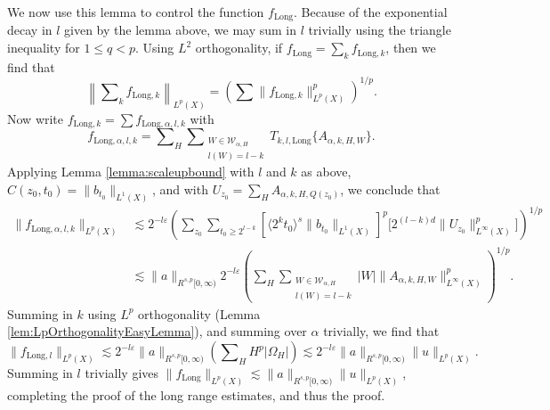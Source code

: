 We now use this lemma to control the function $f_{\text{Long}}$. Because of the exponential decay in $l$ given by the lemma above, we may sum in $l$ trivially using the triangle inequality for $1 \leq q < p$. Using $L^2$ orthogonality, if $f_{\text{Long}} = \sum_k f_{\text{Long},k}$, then we find that
%
\begin{equation}
    \left\| \sum\nolimits_k f_{\text{Long},k} \right\|_{L^p(X)} = \left( \sum \| f_{\text{Long},k} \|_{L^p(X)}^p \right)^{1/p}.
\end{equation}
%
Now write $f_{\text{Long},k} = \sum f_{\text{Long},\alpha,l,k}$ with
%
\begin{equation}
    f_{\text{Long},\alpha,l,k} = \sum\nolimits_H \sum\nolimits_{\substack{W \in \mathcal{W}_{\alpha,H}\\l(W) = l - k}} T_{k,l,\text{Long}} \{ A_{\alpha,k,H,W} \}.
\end{equation}
%
Applying Lemma \ref{lemma:scaleupbound} with $l$ and $k$ as above, $C(z_0,t_0) =  \| b_{t_0} \|_{L^1(X)}$, and with $U_{z_0} = \sum\nolimits_H A_{\alpha,k,H,Q(z_0)}$, we conclude that %
\begin{equation}
\begin{split}
    \| f_{\text{Long},\alpha,l,k} \|_{L^p(X)} &\lesssim 2^{-l \varepsilon} \left( \sum\nolimits_{z_0} \sum\nolimits_{t_0 \geq 2^{l-k}} [ \langle 2^k t_0 \rangle^{s} \| b_{t_0} \|_{L^1(X)} ]^p \big[ 2^{(l-k)d} \| U_{z_0} \|_{L^\infty(X)}^p \big] \right)^{1/p}\\
    &\lesssim \| a \|_{R^{s,p}[0,\infty)} 2^{-l \varepsilon} \left(  \sum\nolimits_H \sum\nolimits_{\substack{W \in \mathcal{W}_{\alpha,H}\\l(W) = l-k}} |W| \| A_{\alpha,k,H,W} \|_{L^\infty(X)}^p \right)^{1/p}.
\end{split}
\end{equation}
Summing in $k$ using $L^p$ orthogonality (Lemma \ref{lem:LpOrthogonalityEasyLemma}), and summing over $\alpha$ trivially, we find that
%
\begin{equation}
    \| f_{\text{Long},l} \|_{L^p(X)} \lesssim 2^{-l \varepsilon}  \| a \|_{R^{s,p}[0,\infty)} \left( \sum\nolimits_H H^p |\Omega_H| \right) \lesssim 2^{-l \varepsilon}  \| a \|_{R^{s,p}[0,\infty)} \| u \|_{L^p(X)}. 
\end{equation}
%
Summing in $l$ trivially gives $\| f_{\text{Long}} \|_{L^p(X)} \lesssim \| a \|_{R^{s,p}[0,\infty)} \| u \|_{L^p(X)}$, completing the proof of the long range estimates, and thus the proof.

